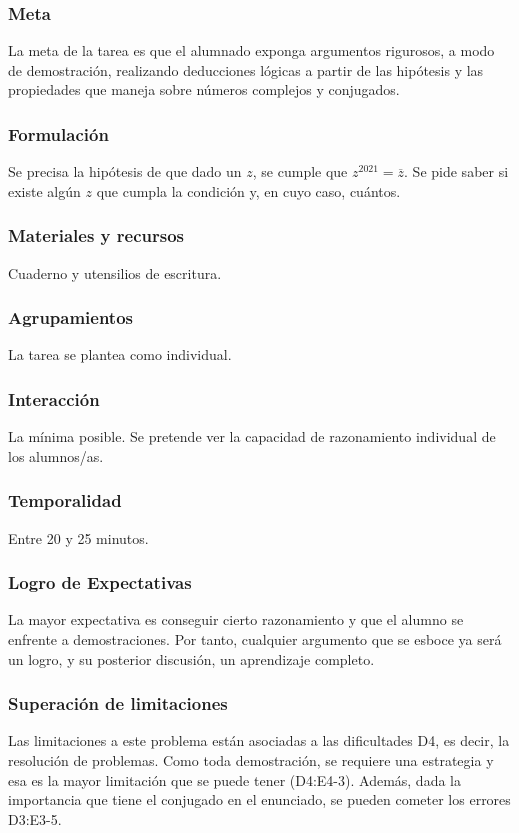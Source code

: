 \documentclass[../main.tex]{memoir}
\begin{document}
\subsubsection{Meta}
La meta de la tarea es que el alumnado exponga argumentos rigurosos, a modo de demostración, realizando deducciones lógicas a partir de las hipótesis y las propiedades que maneja sobre números complejos y conjugados.

\subsubsection{Formulación}
Se precisa la hipótesis de que dado un $z$, se cumple que $z^{2021} = \overline{z}$. Se pide saber si existe algún $z$ que cumpla la condición y, en cuyo caso, cuántos.

\subsubsection{Materiales y recursos}
Cuaderno y utensilios de escritura.


\subsubsection{Agrupamientos}
La tarea se plantea como individual.



\subsubsection{Interacción}
La mínima posible. Se pretende ver la capacidad de razonamiento individual de los alumnos/as.


\subsubsection{Temporalidad}
Entre 20 y 25 minutos.


\subsubsection{Logro de Expectativas}
La mayor expectativa es conseguir cierto razonamiento y que el alumno se enfrente a demostraciones. Por tanto, cualquier argumento que se esboce ya será un logro, y su posterior discusión, un aprendizaje completo. 

\subsubsection{Superación de limitaciones}
Las limitaciones a este problema están asociadas a las dificultades D4, es decir, la resolución de problemas. Como toda demostración, se requiere una estrategia y esa es la mayor limitación que se puede tener (D4:E4-3). Además, dada la importancia que tiene el conjugado en el enunciado, se pueden cometer los errores D3:E3-5.
\end{document}

